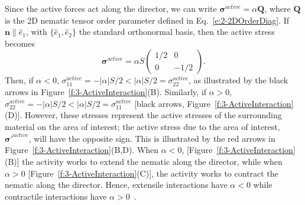 Since the active forces act along the director, we can write $\bm{\sigma}^{active} = \alpha \mathbf{Q}$, where $\mathbf{Q}$ is the 2D nematic tensor order parameter defined in Eq.~\ref{e:2-2DOrderDiag}.
If $\mathbf{n} \parallel \hat{e}_1$, with $\{\hat{e}_1,\hat{e}_2 \}$ the standard orthonormal basis, then the active stress becomes
\begin{equation}
  \bm{\sigma}^{active} = \alpha S
  \begin{pmatrix}
    1/2 & 0 \\ 0 & -1/2
  \end{pmatrix}.
\end{equation}
Then, if $\alpha < 0$, $\sigma_{11}^{active} = - |\alpha|S/2 < |\alpha|S/2 = \sigma_{22}^{active}$, as illustrated by the black arrows in Figure~\ref{f:3-ActiveInteraction}(B).
Similarly, if  $\alpha > 0$, $\sigma_{22}^{active} = - |\alpha|S/2 < |\alpha|S/2 = \sigma_{11}^{active}$ [black arrows, Figure~\ref{f:3-ActiveInteraction}(D)].
However, these stresses represent the active stresses of the surrounding material on the area of interest; the active stress due to the area of interest, $\bm{\sigma}'^{active}$, will have the opposite sign.
This is illustrated by the red arrows in Figure~\ref{f:3-ActiveInteraction}(B,D).
When $\alpha < 0$, [Figure~\ref{f:3-ActiveInteraction}(B)] the activity works to extend the nematic along the director, while when $\alpha > 0$ [Figure~\ref{f:3-ActiveInteraction}(C)], the activity works to contract the nematic along the director.
Hence, extensile interactions have $\alpha < 0$ while contractile interactions have $\alpha > 0$~\cite{RN11}.

